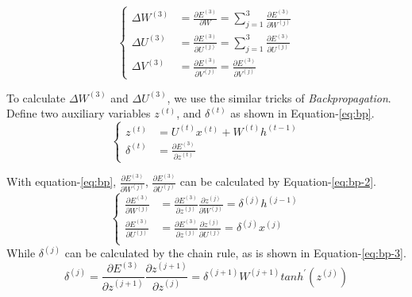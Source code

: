 \documentclass[english]{article}
\begin{document}
\begin{equation}\label{eq:delta-t}\begin{cases}
\Delta W^{(3)} &= \frac{\partial E^{(3)}}{\partial W} = {\sum\limits_{j=1}^3}\frac{\partial E^{(3)}}{\partial W^{(j)}} \\
\Delta U^{(3)} &= \frac{\partial E^{(3)}}{\partial U^{(j)}} = {\sum\limits_{j=1}^3}\frac{\partial E^{(3)}}{\partial U^{(j)}} \\
\Delta V^{(3)} &=\frac{\partial E^{(3)}}{\partial V^{(j)}} = \frac{\partial E^{(3)}}{\partial V^{(j)} }
\end{cases}\end{equation}

 
 To calculate $\Delta W^{(3)}$ and $\Delta U^{(3)}$, we use the similar tricks of \textit{Backpropagation}. Define two auxiliary variables $z^{(t)}$, and  $\delta^{(t)}$ as shown in Equation-\ref{eq:bp}.
 \begin{equation}\label{eq:bp}\begin{cases}
 z^{(t)} &= U^{(t)} x^{(t)} + W^{(t)} h^{(t-1)}\\
 \delta^{(t)} &= \frac{\partial E^{(3)}}{\partial z^{(t)}}
 \end{cases}\end{equation}
 
 
 With equation-\ref{eq:bp},  $\frac{\partial E^{(3)}}{\partial W^{(j)}}$,  $\frac{\partial E^{(3)}}{\partial U^{(j)}}$  can be calculated by Equation-\ref{eq:bp-2}.
 \begin{equation}\label{eq:bp-2}\begin{cases}
 \frac{\partial E^{(3)}}{\partial W^{(j)}} &= \frac{\partial E^{(3)}}{\partial z^{(j)}} \frac{\partial z^{(j)}}{\partial W^{(j)}}  = \delta^{(j)} h^{(j-1)}\\
\frac{\partial E^{(3)}}{\partial U^{(j)}} &= \frac{\partial E^{(3)}}{\partial z^{(j)}} \frac{\partial z^{(j)}}{\partial U^{(j)}}  = \delta^{(j)} x^{(j)}\\
 \end{cases}\end{equation}
 While $\delta^{(j)}$ can be calculated by the chain rule, as is shown in Equation-\ref{eq:bp-3}.
 \begin{equation}\label{eq:bp-3}
  \delta^{(j)} = \frac{\partial E^{(3)}}{\partial z^{(j+1)}} \frac{\partial z^{(j+1)}}{\partial z^{(j)}} =\delta^{(j+1)} W^{(j+1)} tanh^{\prime}(z^{(j)})
 \end{equation}
 
\end{document}
